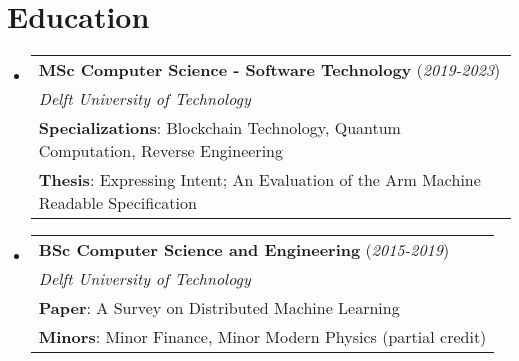 \documentclass[12pt, a4paper]{article}
\begin{document}
  \vspace{-10pt}\section*{Education}
  \begin{itemize}[leftmargin=*]
    \vspace{-1pt}\item[]
    \begin{tabular*}{0.98\textwidth}{l}
      \hspace{-10pt}\textbf{MSc Computer Science - Software Technology} (\textit{\small 2019-2023}) \\
      \hspace{-10pt}\textit{\small Delft University of Technology} \\
      \small{\textbf{Specializations}{: Blockchain Technology, Quantum Computation, Reverse Engineering}} \\
      \small{\textbf{Thesis}{: Expressing Intent; An Evaluation of the Arm Machine Readable Specification}} \\
    \end{tabular*}\vspace{-5pt}
    
    \vspace{-1pt}\item[]
    \begin{tabular*}{0.98\textwidth}{l}
      \hspace{-10pt}\textbf{BSc Computer Science and Engineering} (\textit{\small 2015-2019}) \\
      \hspace{-10pt}\textit{\small Delft University of Technology} \\
      \small{\textbf{Paper}{: A Survey on Distributed Machine Learning}} \\
      \small{\textbf{Minors}{: Minor Finance, Minor Modern Physics (partial credit)}} \\
    \end{tabular*}\vspace{-5pt}
  \end{itemize}
\end{document}
